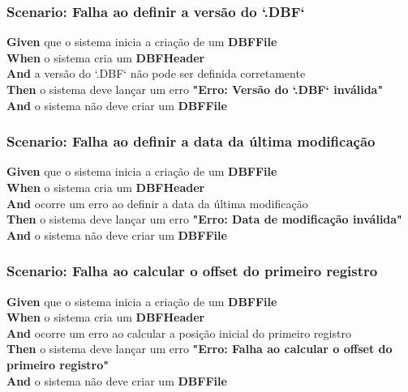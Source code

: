 \subsubsection{Scenario: Falha ao definir a versão do `.DBF`}
\textbf{Given} que o sistema inicia a criação de um \textbf{DBFFile} \\
\textbf{When} o sistema cria um \textbf{DBFHeader} \\
\textbf{And} a versão do `.DBF` não pode ser definida corretamente \\
\textbf{Then} o sistema deve lançar um erro \textbf{"Erro: Versão do `.DBF` inválida"} \\
\textbf{And} o sistema não deve criar um \textbf{DBFFile} \\

\subsubsection{Scenario: Falha ao definir a data da última modificação}
\textbf{Given} que o sistema inicia a criação de um \textbf{DBFFile} \\
\textbf{When} o sistema cria um \textbf{DBFHeader} \\
\textbf{And} ocorre um erro ao definir a data da última modificação \\
\textbf{Then} o sistema deve lançar um erro \textbf{"Erro: Data de modificação inválida"} \\
\textbf{And} o sistema não deve criar um \textbf{DBFFile} \\

\subsubsection{Scenario: Falha ao calcular o offset do primeiro registro}
\textbf{Given} que o sistema inicia a criação de um \textbf{DBFFile} \\
\textbf{When} o sistema cria um \textbf{DBFHeader} \\
\textbf{And} ocorre um erro ao calcular a posição inicial do primeiro registro \\
\textbf{Then} o sistema deve lançar um erro \textbf{"Erro: Falha ao calcular o offset do primeiro registro"} \\
\textbf{And} o sistema não deve criar um \textbf{DBFFile} \\

